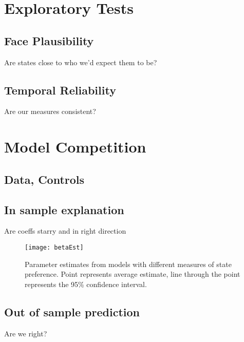 \section{Exploratory Tests}

\subsection{Face Plausibility}

Are states close to who we'd expect them to be?

\subsection{Temporal Reliability}

Are our measures consistent?

\section{Model Competition}

\subsection{Data, Controls}

\subsection{In sample explanation}

Are coeffs starry and in right direction

\begin{figure}[ht]
	\centering
	\texttt{[image: betaEst]}
	\caption{Parameter estimates from models with different measures of state preference. Point represents average estimate, line through the point represents the 95\% confidence interval.}
	\label{fig:coefP}
\end{figure}
\FloatBarrier

\subsection{Out of sample prediction}

Are we right?
